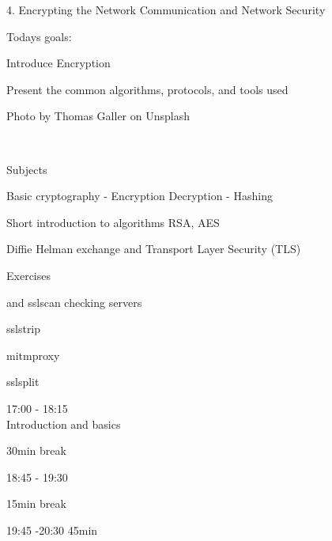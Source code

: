 \documentclass[Screen16to9,17pt]{foils}
\begin{document}
\mytitlepage
{4. Encrypting the Network}
{Communication and Network Security \the\year}




Todays goals:
\begin{list2}
\item Introduce Encryption
\item Present the common algorithms, protocols, and tools used
\end{list2}

Photo by Thomas Galler on Unsplash




{~}

\begin{list1}
\item Subjects
\begin{list2}
\item Basic cryptography - Encryption Decryption - Hashing
\item Short introduction to algorithms RSA, AES
\item Diffie Helman exchange and Transport Layer Security (TLS)
\end{list2}
\item Exercises
\begin{list2}
\item {} and sslscan checking servers
\item sslstrip 
\item mitmproxy 
\item sslsplit 
\end{list2}
\end{list1}




\begin{list2}
\item 17:00 - 18:15\\
Introduction and basics
\item 30min break\\

\item 18:45 - 19:30\\

\item 15min break\\

\item 19:45 -20:30 45min\\
\end{list2}
\end{document}

